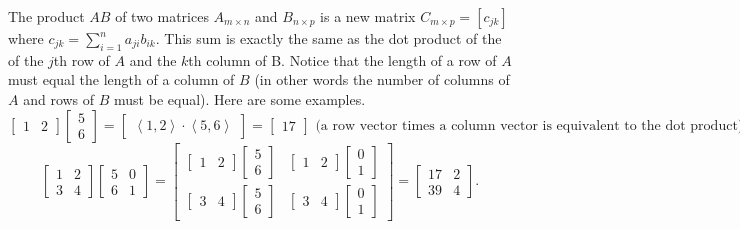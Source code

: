 \documentclass[10pt]{article}
\begin{document}
The product {$AB$} of two matrices {$A_{m\times n}$} and {$B_{n\times p}$} is a new matrix {$C_{m\times p}=[c_{jk}]$} where {$c_{jk}=\sum_{i=1}^n a_{ji}b_{ik}$}. This sum is exactly the same as the dot product of the of the {$j$}th row of {$A$} and the {$k$}th column of B. Notice that the length of a row of $A$ must equal the length of a column of $B$ (in other words the number of columns of $A$ and rows of $B$ must be equal). Here are some examples. 
$$ 
\begin{bmatrix}1 & 2\end{bmatrix}\begin{bmatrix}5\\6\end{bmatrix} =
\begin{bmatrix}\left<1 , 2\right>\cdot \left<5 , 6\right>\end{bmatrix} = \begin{bmatrix}17\end{bmatrix}
\text{ (a row vector times a column vector is equivalent to the dot product)}
$$
$$ 
\begin{bmatrix}1 &2\\3&4\end{bmatrix}\begin{bmatrix}5&0\\6&1\end{bmatrix} =
\begin{bmatrix}
\begin{bmatrix}1 &2\end{bmatrix}\begin{bmatrix}5\\6\end{bmatrix}
&\begin{bmatrix}1 &2\end{bmatrix}\begin{bmatrix}0\\1\end{bmatrix}
\\\begin{bmatrix}3&4\end{bmatrix}\begin{bmatrix}5 \\ 6\end{bmatrix}
&\begin{bmatrix}3&4\end{bmatrix}\begin{bmatrix}0 \\ 1\end{bmatrix}
\end{bmatrix}
=
\begin{bmatrix}17&2\\39&4\end{bmatrix}.$$
\end{document}
